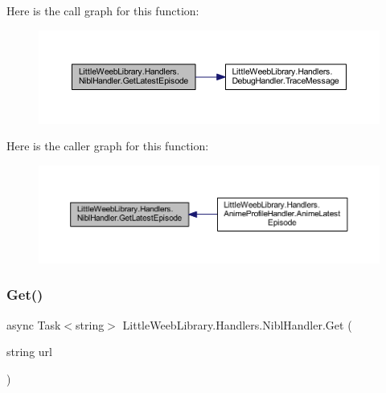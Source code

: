 Here is the call graph for this function\+:\nopagebreak
\begin{figure}[H]
\begin{center}
\leavevmode
\includegraphics[width=350pt]{class_little_weeb_library_1_1_handlers_1_1_nibl_handler_a149bf3305de6348eaddee4afb92d5095_cgraph}
\end{center}
\end{figure}
Here is the caller graph for this function\+:\nopagebreak
\begin{figure}[H]
\begin{center}
\leavevmode
\includegraphics[width=350pt]{class_little_weeb_library_1_1_handlers_1_1_nibl_handler_a149bf3305de6348eaddee4afb92d5095_icgraph}
\end{center}
\end{figure}
\mbox{\label{class_little_weeb_library_1_1_handlers_1_1_nibl_handler_a2989b180582fadd05111d010c0700411}} 
\subsubsection{\texorpdfstring{Get()}{Get()}}
{\footnotesize\ttfamily async Task$<$string$>$ Little\+Weeb\+Library.\+Handlers.\+Nibl\+Handler.\+Get (\begin{DoxyParamCaption}\item[{string}]{url }\end{DoxyParamCaption})\hspace{0.3cm}{\ttfamily [private]}}



